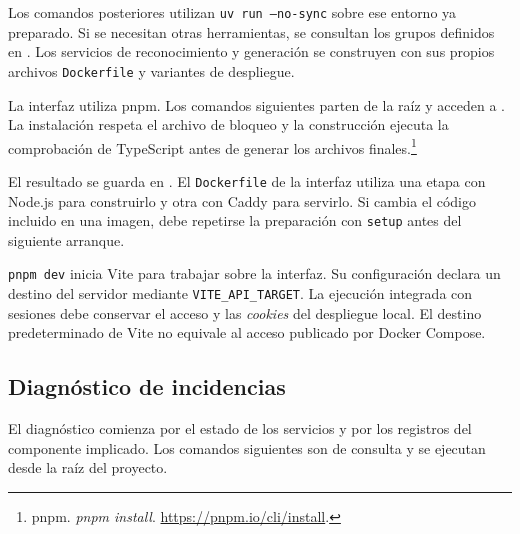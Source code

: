 
Los comandos posteriores utilizan \texttt{uv run --no-sync} sobre ese entorno ya preparado. Si se necesitan otras herramientas, se consultan los grupos definidos en . Los servicios de reconocimiento y generación se construyen con sus propios archivos \texttt{Dockerfile} y variantes de despliegue.

La interfaz utiliza pnpm. Los comandos siguientes parten de la raíz y acceden a . La instalación respeta el archivo de bloqueo y la construcción ejecuta la comprobación de TypeScript antes de generar los archivos finales.\footnote{pnpm. \emph{pnpm install}. \url{https://pnpm.io/cli/install}.}


El resultado se guarda en . El \texttt{Dockerfile} de la interfaz utiliza una etapa con Node.js para construirlo y otra con Caddy para servirlo. Si cambia el código incluido en una imagen, debe repetirse la preparación con \texttt{setup} antes del siguiente arranque.

\texttt{pnpm dev} inicia Vite para trabajar sobre la interfaz. Su configuración declara un destino del servidor mediante \texttt{VITE\_API\_TARGET}. La ejecución integrada con sesiones debe conservar el acceso y las \textit{cookies} del despliegue local. El destino predeterminado de Vite no equivale al acceso publicado por Docker Compose.


\subsection{Diagnóstico de incidencias}

El diagnóstico comienza por el estado de los servicios y por los registros del componente implicado. Los comandos siguientes son de consulta y se ejecutan desde la raíz del proyecto.


